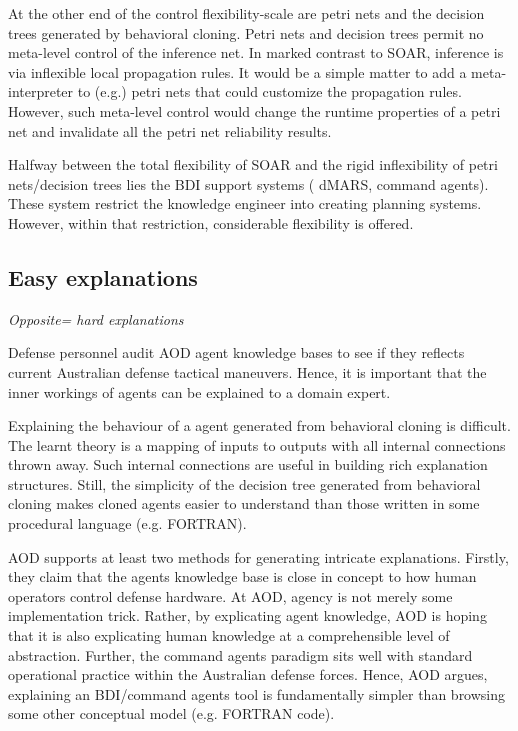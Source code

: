At the other end of the control flexibility-scale are petri nets
and the decision trees generated by behavioral cloning. Petri nets
and decision trees permit no meta-level control of the inference
net. In marked contrast to SOAR, inference is via inflexible local
propagation rules. It would be a simple matter to add a
meta-interpreter to (e.g.) petri nets that could customize the
propagation rules. However, such meta-level control would change
the runtime properties of a petri net and invalidate all the petri
net reliability results.

Halfway between the total flexibility of SOAR and the rigid
inflexibility of petri nets/decision trees lies the BDI support
systems ( dMARS, command agents). These system restrict the
knowledge engineer into creating planning systems. However, within
that restriction, considerable flexibility is offered.

\subsection{Easy explanations}\label{sec:xplain}

{\em Opposite= hard explanations}

Defense personnel  audit AOD agent knowledge bases to see if they
reflects current Australian defense tactical maneuvers. Hence, it
is important that the inner workings of agents can be explained to
a domain expert.

Explaining the behaviour of a agent generated from behavioral
cloning is difficult. The learnt theory is a mapping of inputs to
outputs with all internal connections thrown away. Such internal
connections are useful in building rich explanation structures.
Still,  the simplicity of the decision tree generated from
behavioral cloning makes cloned agents easier to understand than
those written in some procedural language (e.g. FORTRAN).

AOD supports at least two methods for generating intricate
explanations. Firstly, they claim that the agents knowledge base
is close in concept to how human operators control defense
hardware. At AOD, agency is not merely some implementation trick.
Rather, by explicating agent knowledge, AOD is hoping that it is
also explicating  human knowledge at a comprehensible level of
abstraction. Further, the command agents paradigm sits well with
standard operational practice within the Australian defense
forces. Hence, AOD argues, explaining an BDI/command agents tool
is fundamentally simpler than browsing some other conceptual model
(e.g. FORTRAN code).

